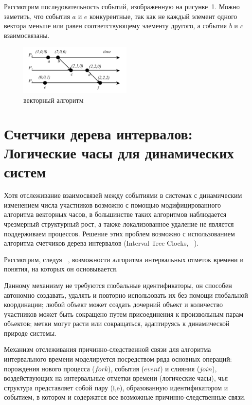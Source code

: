 Рассмотрим последовательность событий, изображенную на рисунке~\ref{fig:vector-algo}. Можно заметить, что события $a$ и $e$ конкурентные, так как не каждый элемент одного вектора меньше или равен соответствующему элементу другого, а события $b$ и $c$ взаимосвязаны. 

\begin{figure}
\centering
\includegraphics[width=0.5\textwidth]{img/vector.jpg}
\caption{векторный алгоритм}
\label{fig:vector-algo}
\end{figure}

\section{Счетчики дерева интервалов: Логические часы для динамических систем}
Хотя отслеживание взаимосвязей между событиями в системах с динамическим изменением числа участников возможно с помощью модифицированного алгоритма векторных часов, в большинстве таких алгоритмов наблюдается чрезмерный структурный рост, а также локализованное удаление не является поддерживаем процессов. Решение этих проблем возможно с использованием алгоритма счетчиков дерева интервалов (Interval Tree Clocks, ~\cite{itc_article}).

Рассмотрим, следуя ~\cite{itc_article}, возможности алгоритма интервальных отметок времени и понятия, на которых он основывается.

Данному механизму не требуются глобальные идентификаторы, он способен автономно создавать, удалять и повторно использовать их без помощи глобальной координации; любой объект может создать дочерний объект и количество участников может быть сокращено путем присоединения к произвольным парам объектов; метки могут расти или сокращаться, адаптируясь к динамической природе системы.

Механизм отслеживания причинно-следственной связи для алгоритма интервального времени моделируется посредством ряда основных операций: порождения нового процесса ($fork$), события ($event$) и слияния ($join$), воздействующих на интервальные отметки времени (логические часы), чья структура представляет собой пару (i,e), образованную идентификатором и событием, в котором и содержатся все возможные причинно-следственные связи.

